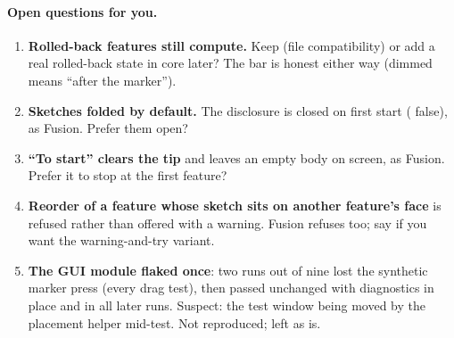 \paragraph{Open questions for you.}
\begin{enumerate}[nosep]
  \item \textbf{Rolled-back features still compute.} Keep  (file compatibility) or add a real rolled-back
        state in core later? The bar is honest either way (dimmed means ``after the marker'').
  \item \textbf{Sketches folded by default.} The disclosure is closed on first start ( false),
        as Fusion. Prefer them open?
  \item \textbf{``To start'' clears the tip} and leaves an empty body on screen, as Fusion. Prefer it to stop at the
        first feature?
  \item \textbf{Reorder of a feature whose sketch sits on another feature's face} is refused rather than offered
        with a warning. Fusion refuses too; say if you want the warning-and-try variant.
  \item \textbf{The GUI module flaked once}: two runs out of nine lost the synthetic marker press (every drag test),
        then passed unchanged with diagnostics in place and in all later runs. Suspect: the test window being moved by
        the placement helper mid-test. Not reproduced; left as is.
\end{enumerate}
